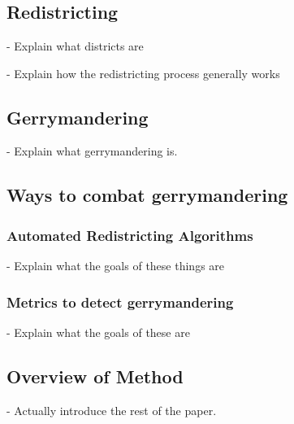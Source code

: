 \makeatletter
\section{\@title}
\makeatother

\subsection{Redistricting}

- Explain what districts are

- Explain how the redistricting process generally works

\subsection{Gerrymandering}

- Explain what gerrymandering is.

\subsection{Ways to combat gerrymandering}

\subsubsection{Automated Redistricting Algorithms}

- Explain what the goals of these things are

\subsubsection{Metrics to detect gerrymandering}

- Explain what the goals of these are

\subsection{Overview of Method}

- Actually introduce the rest of the paper. 

